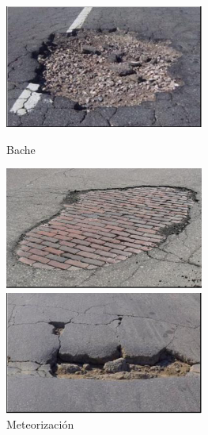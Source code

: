 \begin{figure}[ht!]
	\centering
	\begin{minipage}{0.3\linewidth}
		\centering
		\includegraphics[width=\linewidth]{figs/bache.png}
		\caption*{\centering Bache}
	\end{minipage}
	\hspace{3 cm}
	\begin{minipage}{0.3\linewidth}
		\centering
		\includegraphics[width=\linewidth]{figs/meteo.png}
		\caption*{\centering Meteorización}
	\end{minipage}
	\hspace{3 cm}
	\begin{minipage}{0.3\linewidth}
		\centering
		\includegraphics[width=\linewidth]{figs/blandon.png}

\end{minipage}
\end{figure}
